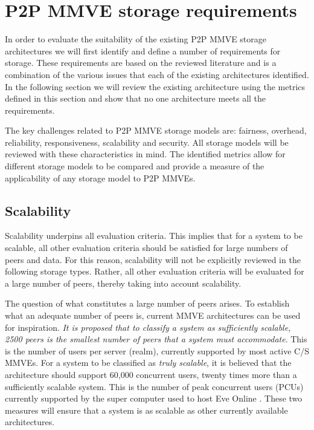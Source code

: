 \section{P2P MMVE storage requirements}
\label{key_challenges_cm}

In order to evaluate the suitability of the existing P2P MMVE storage architectures we will first identify and define a number of requirements for storage. These requirements are based on the reviewed literature and is a combination of the various issues that each of the existing architectures identified. In the following section we will review the existing architecture using the metrics defined in this section and show that no one architecture meets all the requirements.

The key challenges related to P2P MMVE storage models are: fairness, overhead, reliability, responsiveness, scalability and security. All storage models will be reviewed with these characteristics in mind. The identified metrics allow for different storage models to be compared and provide a measure of the applicability of any storage model to P2P MMVEs.

\subsection{Scalability}
\label{scalability_req}
Scalability underpins all evaluation criteria. This implies that for a system to be scalable, all other evaluation criteria should be satisfied for large numbers of peers and data. For this reason, scalability will not be explicitly reviewed in the following storage types. Rather, all other evaluation criteria will be evaluated for a large number of peers, thereby taking into account scalability.

The question of what constitutes a large number of peers arises. To establish what an adequate number of peers is, current MMVE architectures can be used for inspiration. \emph{It is proposed that to classify a system as sufficiently scalable, 2500 peers is the smallest number of peers that a system must accommodate}. This is the number of users per server (realm), currently supported by most active C/S MMVEs. For a system to be classified as \emph{truly scalable}, it is believed that the architecture should support 60,000 concurrent users, twenty times more than a sufficiently scalable system. This is the number of peak concurrent users (PCUs) currently supported by the super computer used to host Eve Online \cite{eve_pcu}. These two measures will ensure that a system is as scalable as other currently available architectures.

